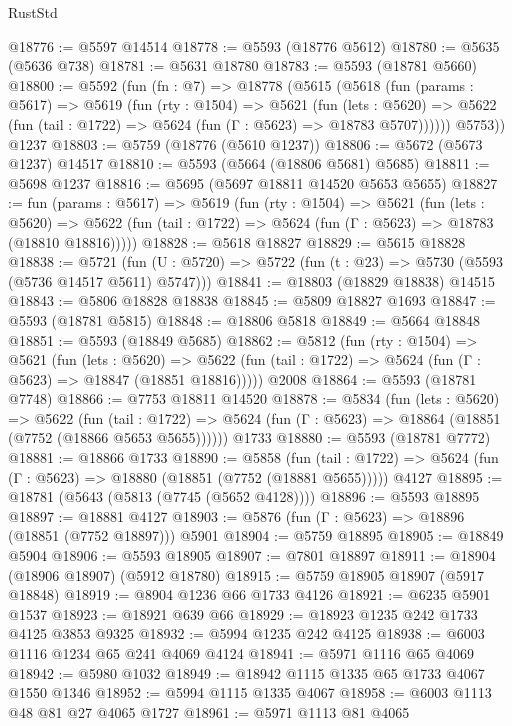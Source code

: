 \begin{lexlean}{RustStd}
\begin{coremodule}
@18776 := @5597 @14514
@18778 := @5593 (@18776 @5612)
@18780 := @5635 (@5636 @738)
@18781 := @5631 @18780
@18783 := @5593 (@18781 @5660)
@18800 := @5592
    (fun (fn : @7) =>
    @18778
      (@5615
        (@5618
          (fun (params : @5617) =>
          @5619
            (fun (rty : @1504) =>
            @5621
              (fun (lets : @5620) =>
              @5622 (fun (tail : @1722) => @5624 (fun (Γ : @5623) => @18783 @5707))))))
        @5753))
    @1237
@18803 := @5759 (@18776 (@5610 @1237))
@18806 := @5672 (@5673 @1237) @14517
@18810 := @5593 (@5664 (@18806 @5681) @5685)
@18811 := @5698 @1237
@18816 := @5695 (@5697 @18811 @14520 @5653 @5655)
@18827 := fun (params : @5617) =>
  @5619
    (fun (rty : @1504) =>
    @5621
      (fun (lets : @5620) =>
      @5622 (fun (tail : @1722) => @5624 (fun (Γ : @5623) => @18783 (@18810 @18816)))))
@18828 := @5618 @18827
@18829 := @5615 @18828
@18838 := @5721
    (fun (U : @5720) => @5722 (fun (t : @23) => @5730 (@5593 (@5736 @14517 @5611) @5747)))
@18841 := @18803 (@18829 @18838) @14515
@18843 := @5806 @18828 @18838
@18845 := @5809 @18827 @1693
@18847 := @5593 (@18781 @5815)
@18848 := @18806 @5818
@18849 := @5664 @18848
@18851 := @5593 (@18849 @5685)
@18862 := @5812
    (fun (rty : @1504) =>
    @5621
      (fun (lets : @5620) =>
      @5622 (fun (tail : @1722) => @5624 (fun (Γ : @5623) => @18847 (@18851 @18816)))))
    @2008
@18864 := @5593 (@18781 @7748)
@18866 := @7753 @18811 @14520
@18878 := @5834
    (fun (lets : @5620) =>
    @5622
      (fun (tail : @1722) =>
      @5624 (fun (Γ : @5623) => @18864 (@18851 (@7752 (@18866 @5653 @5655))))))
    @1733
@18880 := @5593 (@18781 @7772)
@18881 := @18866 @1733
@18890 := @5858
    (fun (tail : @1722) => @5624 (fun (Γ : @5623) => @18880 (@18851 (@7752 (@18881 @5655)))))
    @4127
@18895 := @18781 (@5643 (@5813 (@7745 (@5652 @4128))))
@18896 := @5593 @18895
@18897 := @18881 @4127
@18903 := @5876 (fun (Γ : @5623) => @18896 (@18851 (@7752 @18897))) @5901
@18904 := @5759 @18895
@18905 := @18849 @5904
@18906 := @5593 @18905
@18907 := @7801 @18897
@18911 := @18904 (@18906 @18907) (@5912 @18780)
@18915 := @5759 @18905 @18907 (@5917 @18848)
@18919 := @8904 @1236 @66 @1733 @4126
@18921 := @6235 @5901 @1537
@18923 := @18921 @639 @66
@18929 := @18923 @1235 @242 @1733 @4125 @3853 @9325
@18932 := @5994 @1235 @242 @4125
@18938 := @6003 @1116 @1234 @65 @241 @4069 @4124
@18941 := @5971 @1116 @65 @4069
@18942 := @5980 @1032
@18949 := @18942 @1115 @1335 @65 @1733 @4067 @1550 @1346
@18952 := @5994 @1115 @1335 @4067
@18958 := @6003 @1113 @48 @81 @27 @4065 @1727
@18961 := @5971 @1113 @81 @4065

\end{coremodule}
\end{lexlean}

